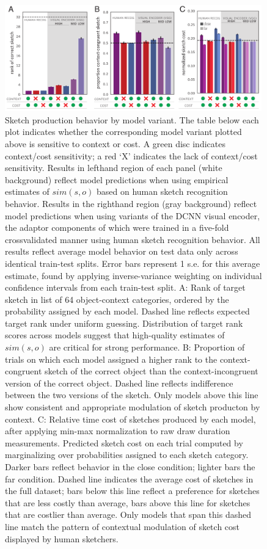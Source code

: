 \documentclass[9pt,twocolumn,twoside]{pnas-new}
\begin{document}
\begin{figure}[htbp]
\centering
\includegraphics[width=0.99\textwidth]{figures/5_model_results_2.pdf}
\caption{Sketch production behavior by model variant. The table below each plot indicates whether the corresponding model variant plotted above is sensitive to context or cost. A green disc indicates context/cost sensitivity; a red `X' indicates the lack of context/cost sensitivity. 
Results in lefthand region of each panel (white background) reflect model predictions when using empirical estimates of $sim(s,o)$ based on human sketch recognition behavior. 
Results in the righthand region (gray background) reflect model predictions when using variants of the DCNN visual encoder, the adaptor components of which were trained in a five-fold crossvalidated manner using human sketch recognition behavior. 
All results reflect average model behavior on test data only across identical train-test splits. 
Error bars represent 1 s.e. for this average estimate, found by applying inverse-variance weighting on individual confidence intervals from each train-test split. 
A: Rank of target sketch in list of 64 object-context categories, ordered by the probability assigned by each model. 
Dashed line reflects expected target rank under uniform guessing. 
Distribution of target rank scores across models suggest that high-quality estimates of $sim(s,o)$ are critical for strong performance. 
B: Proportion of trials on which each model assigned a higher rank to the context-congruent sketch of the correct object than the context-incongruent version of the correct object. 
Dashed line reflects indifference between the two versions of the sketch. 
Only models above this line show consistent and appropriate modulation of sketch producton by context. C: Relative time cost of sketches produced by each model, after applying min-max normalization to raw draw duration measurements. 
Predicted sketch cost on each trial computed by marginalizing over probabilities assigned to each sketch category. 
Darker bars reflect behavior in the close condition; lighter bars the far condition. 
Dashed line indicates the average cost of sketches in the full dataset; bars below this line reflect a preference for sketches that are less costly than average, bars above this line for sketches that are costlier than average. 
Only models that span this dashed line match the pattern of contextual modulation of sketch cost displayed by human sketchers.}
\label{model_results}
\end{figure}
\end{document}
